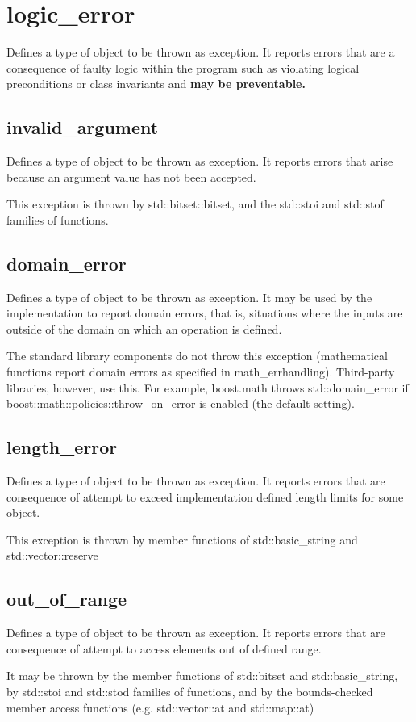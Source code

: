 \documentclass[UTF8,a4paper,12pt]{ctexbook}
\begin{document}
	\section{logic\_error}
		Defines a type of object to be thrown as exception. It reports errors that are a consequence of faulty logic within the program such as violating logical preconditions or class invariants and \textbf{may be preventable.}
		\subsection{invalid\_argument}
			Defines a type of object to be thrown as exception. It reports errors that arise because an argument value has not been accepted.
			
			This exception is thrown by std::bitset::bitset, and the std::stoi and std::stof families of functions. 
		\subsection{domain\_error}
			Defines a type of object to be thrown as exception. It may be used by the implementation to report domain errors, that is, situations where the inputs are outside of the domain on which an operation is defined.
			
			The standard library components do not throw this exception (mathematical functions report domain errors as specified in math\_errhandling). Third-party libraries, however, use this. For example, boost.math throws std::domain\_error if boost::math::policies::throw\_on\_error is enabled (the default setting). 
		\subsection{length\_error}
			Defines a type of object to be thrown as exception. It reports errors that are consequence of attempt to exceed implementation defined length limits for some object.
			
			This exception is thrown by member functions of std::basic\_string and std::vector::reserve 
		\subsection{out\_of\_range}
			Defines a type of object to be thrown as exception. It reports errors that are consequence of attempt to access elements out of defined range.
			
			It may be thrown by the member functions of std::bitset and std::basic\_string, by std::stoi and std::stod families of functions, and by the bounds-checked member access functions (e.g. std::vector::at and std::map::at) 
\end{document}
